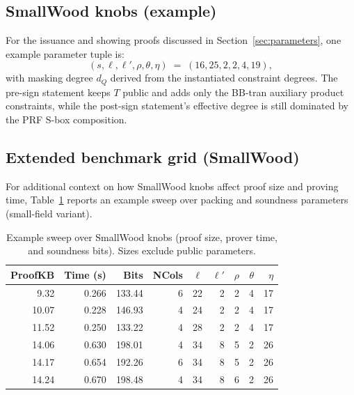 \subsection{SmallWood knobs (example)}
For the issuance and showing proofs discussed in Section~\ref{sec:parameters}, one example parameter tuple is:
\[
  (s,\ell,\ell',\rho,\theta,\eta)\;=\;(16,25,2,2,4,19),
\]
with masking degree \(d_Q\) derived from the instantiated constraint degrees.
The pre-sign statement keeps \(T\) public and adds only the BB-tran auxiliary
product constraints, while the post-sign statement’s effective degree is still
dominated by the PRF S-box composition.

\subsection{Extended benchmark grid (SmallWood)}
For additional context on how SmallWood knobs affect proof size and proving time, Table~\ref{tab:results-grid} reports
an example sweep over packing and soundness parameters (small-field variant).

\begin{table}[H]
\centering
\footnotesize
\setlength{\tabcolsep}{4pt}
\begin{tabular}{r r r r r r r r r}
\toprule
\textbf{ProofKB} & \textbf{Time (s)} & \textbf{Bits} & \textbf{NCols} & \(\ell\) & \(\ell'\) & \(\rho\) & \(\theta\) & \(\eta\)\\
\midrule
\ \ 9.32 & 0.266 & 133.44 & 6 & 22 & 2 & 2 & 4 & 17 \\
10.07 & 0.228 & 146.93 & 4 & 24 & 2 & 2 & 4 & 17 \\
11.52 & 0.250 & 133.22 & 4 & 28 & 2 & 2 & 4 & 17 \\
\midrule[1.2pt]
14.06 & 0.630 & 198.01 & 4 & 34 & 8 & 5 & 2 & 26 \\
14.17 & 0.654 & 192.26 & 6 & 34 & 8 & 5 & 2 & 26 \\
14.24 & 0.670 & 198.48 & 4 & 34 & 8 & 6 & 2 & 26 \\
\bottomrule
\end{tabular}
\caption{Example sweep over SmallWood knobs (proof size, prover time, and soundness bits). Sizes exclude public
parameters.}
\label{tab:results-grid}
\end{table}
